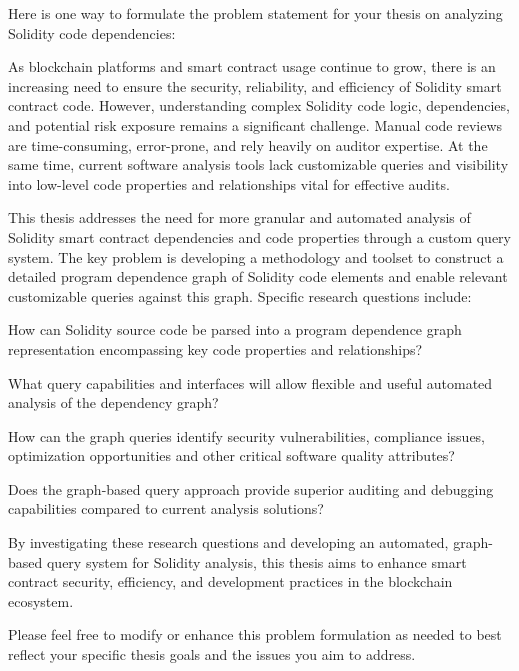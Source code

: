{
Here is one way to formulate the problem statement for your thesis on analyzing Solidity code dependencies:

As blockchain platforms and smart contract usage continue to grow, there is an increasing need to ensure
the security, reliability, and efficiency of Solidity smart contract code.
However, understanding complex Solidity code logic, dependencies, and potential risk
exposure remains a significant challenge.
Manual code reviews are time-consuming, error-prone, and rely heavily on auditor expertise.
At the same time, current software analysis tools lack
customizable queries and visibility into low-level code properties and relationships vital for effective audits.

This thesis addresses the need for more granular and automated analysis of Solidity smart contract
dependencies and code properties through a custom query system.
The key problem is developing a methodology
and toolset to construct a detailed program dependence graph of Solidity code elements and enable relevant
customizable queries against this graph.
Specific research questions include:

How can Solidity source code be parsed into a program dependence graph representation encompassing key code properties and relationships?

What query capabilities and interfaces will allow flexible and useful automated analysis of the dependency graph?

How can the graph queries identify security vulnerabilities, compliance issues, optimization opportunities and other critical software quality attributes?

Does the graph-based query approach provide superior auditing and debugging capabilities compared to current analysis solutions?

By investigating these research questions and developing an automated, graph-based query system for Solidity analysis, this thesis aims to enhance smart contract security, efficiency, and development practices in the blockchain ecosystem.

Please feel free to modify or enhance this problem formulation as needed to best reflect your specific thesis goals and the issues you aim to address.
}